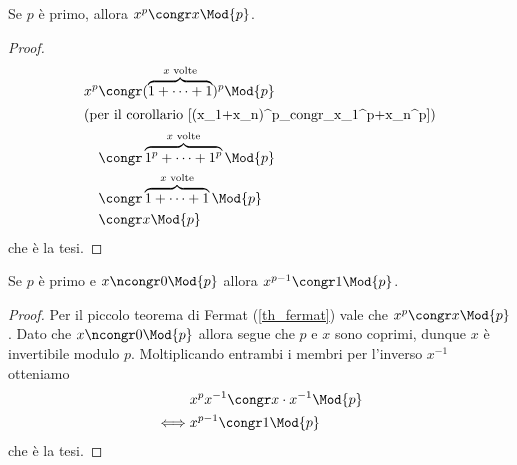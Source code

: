 \begin{theorem}
     \label{th_fermat}
    Se $p$ è primo, allora $x^p \congr x \Mod{p}$.
\end{theorem}
\begin{proof}
    \begin{alignat*}{1}
        x^p &\congr (\overbrace{1 +\dots+ 1}^{x \text{ volte}})^p \Mod{p}\\
        \intertext{(per il corollario \ref{(x_1+x_n)^p_congr_x_1^p+x_n^p})}
        &\congr \overbrace{1^p +\dots+ 1^p}^{x \text{ volte}} \Mod{p}\\
        &\congr \overbrace{1 +\dots+ 1}^{x \text{ volte}} \Mod{p}\\
        &\congr x \Mod{p}
    \end{alignat*}
    che è la tesi.
\end{proof}

\begin{corollary} \label{corollario_fermat}
    Se $p$ è primo e $x \ncongr 0 \Mod{p}$ allora $x^{p-1} \congr 1 \Mod{p}$.
\end{corollary}
\begin{proof}
    Per il piccolo teorema di Fermat (\ref{th_fermat}) vale che $x^p \congr x \Mod{p}$. Dato che $x \ncongr 0 \Mod{p}$ allora segue che $p$ e $x$ sono coprimi, dunque $x$ è invertibile modulo $p$. Moltiplicando entrambi i membri per l'inverso $x^{-1}$ otteniamo \begin{alignat*}
        {1}
        &x^px^{-1} \congr x\cdot x^{-1} \Mod{p}\\
        \iff &x^{p-1} \congr 1 \Mod{p}
    \end{alignat*}
    che è la tesi.    
\end{proof}